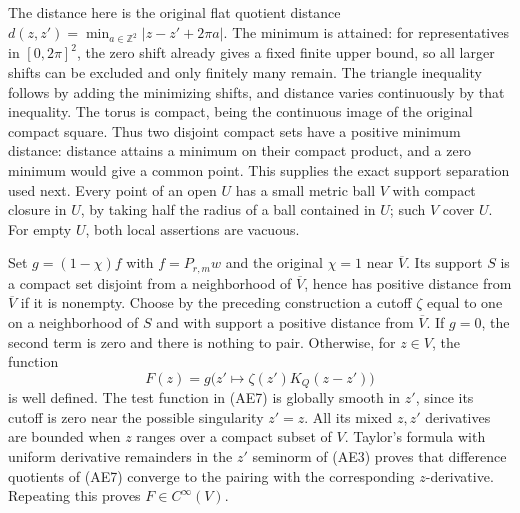 \documentclass[
  11pt,
]{article}
\begin{document}
The distance here is the original flat quotient distance
\(d(z,z')=\min_{a\in\mathbb Z^2}|z-z'+2\pi a|\). The minimum is
attained: for representatives in \([0,2\pi]^2\), the zero shift already
gives a fixed finite upper bound, so all larger shifts can be excluded
and only finitely many remain. The triangle inequality follows by adding
the minimizing shifts, and distance varies continuously by that
inequality. The torus is compact, being the continuous image of the
original compact square. Thus two disjoint compact sets have a positive
minimum distance: distance attains a minimum on their compact product,
and a zero minimum would give a common point. This supplies the exact
support separation used next. Every point of an open \(U\) has a small
metric ball \(V\) with compact closure in \(U\), by taking half the
radius of a ball contained in \(U\); such \(V\) cover \(U\). For empty
\(U\), both local assertions are vacuous.

Set \(g=(1-\chi)f\) with \(f=P_{r,m}w\) and the original \(\chi=1\) near
\(\overline V\). Its support \(S\) is a compact set disjoint from a
neighborhood of \(\overline V\), hence has positive distance from
\(\overline V\) if it is nonempty. Choose by the preceding construction
a cutoff \(\zeta\) equal to one on a neighborhood of \(S\) and with
support a positive distance from \(\overline V\). If \(g=0\), the second
term is zero and there is nothing to pair. Otherwise, for \(z\in V\),
the function \[
 F(z)=g\bigl(z'\longmapsto\zeta(z')K_Q(z-z')\bigr)
 \tag{AE7}
\] is well defined. The test function in (AE7) is globally smooth in
\(z'\), since its cutoff is zero near the possible singularity \(z'=z\).
All its mixed \(z,z'\) derivatives are bounded when \(z\) ranges over a
compact subset of \(V\). Taylor's formula with uniform derivative
remainders in the \(z'\) seminorm of (AE3) proves that difference
quotients of (AE7) converge to the pairing with the corresponding
\(z\)-derivative. Repeating this proves \(F\in C^\infty(V)\).
\end{document}
